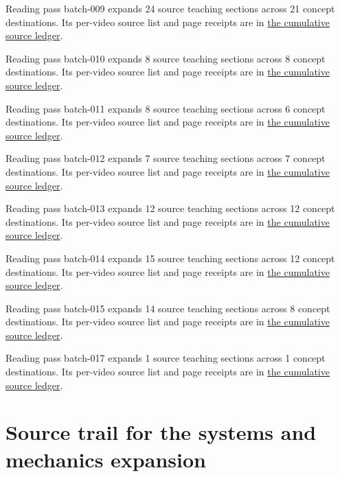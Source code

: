 Reading pass batch-009 expands 24 source teaching sections across 21 concept destinations. Its per-video source list and page receipts are in \hyperref[appendix-877738f6f4d2-batch-009-expanded-reading-and-integration]{the cumulative source ledger}.

Reading pass batch-010 expands 8 source teaching sections across 8 concept destinations. Its per-video source list and page receipts are in \hyperref[appendix-877738f6f4d2-batch-010-expanded-reading-and-integration]{the cumulative source ledger}.

Reading pass batch-011 expands 8 source teaching sections across 6 concept destinations. Its per-video source list and page receipts are in \hyperref[appendix-877738f6f4d2-batch-011-expanded-reading-and-integration]{the cumulative source ledger}.

Reading pass batch-012 expands 7 source teaching sections across 7 concept destinations. Its per-video source list and page receipts are in \hyperref[appendix-877738f6f4d2-batch-012-expanded-reading-and-integration]{the cumulative source ledger}.

Reading pass batch-013 expands 12 source teaching sections across 12 concept destinations. Its per-video source list and page receipts are in \hyperref[appendix-877738f6f4d2-batch-013-expanded-reading-and-integration]{the cumulative source ledger}.

Reading pass batch-014 expands 15 source teaching sections across 12 concept destinations. Its per-video source list and page receipts are in \hyperref[appendix-877738f6f4d2-batch-014-expanded-reading-and-integration]{the cumulative source ledger}.

Reading pass batch-015 expands 14 source teaching sections across 8 concept destinations. Its per-video source list and page receipts are in \hyperref[appendix-877738f6f4d2-batch-015-expanded-reading-and-integration]{the cumulative source ledger}.

Reading pass batch-017 expands 1 source teaching sections across 1 concept destinations. Its per-video source list and page receipts are in \hyperref[appendix-877738f6f4d2-batch-017-expanded-reading-and-integration]{the cumulative source ledger}.

\section{Source trail for the systems and mechanics expansion}\label{06-engine-ii-ch042-source-trail-for-the-systems-and-mechanics-expansion}

